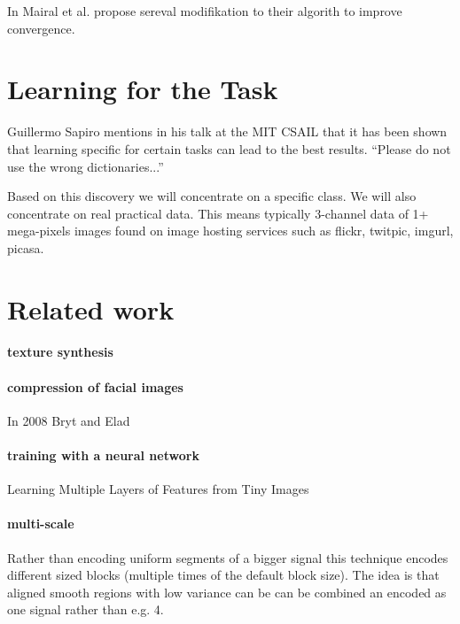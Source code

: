 In \cite{Mairal2010} Mairal et al. propose sereval modifikation to their algorith to improve convergence.



\section{Learning for the Task}
Guillermo Sapiro mentions in his talk \cite{sapiroSlides} at the MIT CSAIL that it has been shown that learning specific for certain tasks can lead to the best results.
``Please do not use the wrong dictionaries...''

Based on this discovery we will concentrate on a specific class. 
We will also concentrate on real practical data. This means typically 3-channel data of 1+ mega-pixels images found on image hosting services such as flickr, twitpic, imgurl, picasa.


\section{Related work}




\paragraph{texture synthesis}

\paragraph{compression of facial images}
In 2008 Bryt and Elad \cite{Bryt2008} 

\paragraph{training with a neural network}
Learning Multiple Layers of Features from Tiny Images \cite{Krizhevsky2009}


\paragraph{multi-scale}
Rather than encoding uniform segments of a bigger signal this technique encodes different sized 
blocks (multiple times of the default block size). The idea is that aligned smooth regions with low variance can be 
can be combined an encoded as one signal rather than e.g. 4. \cite{saprioSlides}
\cite{Mairal2007}

